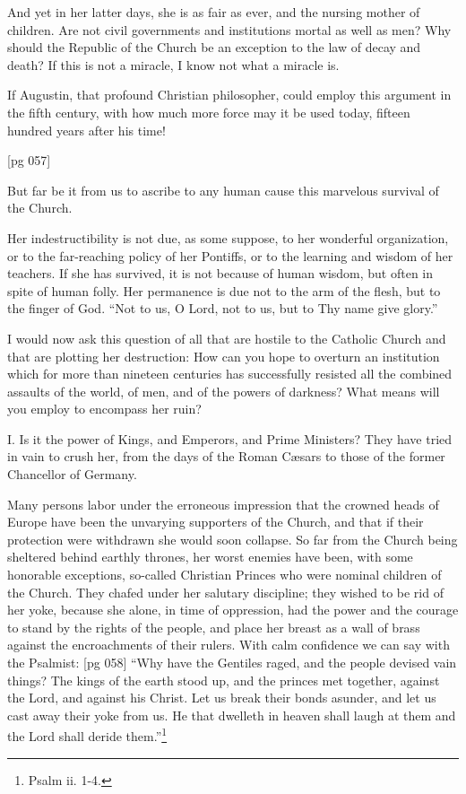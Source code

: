 And yet in her latter days, she is as fair as ever,
and the nursing mother of children. Are not civil
governments and institutions mortal as well as
men? Why should the Republic of the Church be
an exception to the law of decay and death? If
this is not a miracle, I know not what a miracle is.

If Augustin, that profound Christian philosopher,
could employ this argument in the fifth century,
with how much more force may it be used
today, fifteen hundred years after his time!

[pg 057]

But far be it from us to ascribe to any human
cause this marvelous survival of the Church.

Her indestructibility is not due, as some suppose,
to her wonderful organization, or to the far-reaching
policy of her Pontiffs, or to the learning and
wisdom of her teachers. If she has survived, it is
not because of human wisdom, but often in spite of
human folly. Her permanence is due not to the
arm of the flesh, but to the finger of God. “Not to
us, O Lord, not to us, but to Thy name give glory.”

I would now ask this question of all that are
hostile to the Catholic Church and that are plotting
her destruction: How can you hope to overturn
an institution which for more than nineteen
centuries has successfully resisted all the combined
assaults of the world, of men, and of the
powers of darkness? What means will you employ
to encompass her ruin?

I. Is it the power of Kings, and Emperors,
and Prime Ministers? They have tried in vain
to crush her, from the days of the Roman Cæsars
to those of the former Chancellor of Germany.

Many persons labor under the erroneous impression
that the crowned heads of Europe have
been the unvarying supporters of the Church, and
that if their protection were withdrawn she would
soon collapse. So far from the Church being
sheltered behind earthly thrones, her worst enemies
have been, with some honorable exceptions,
so-called Christian Princes who were nominal children
of the Church. They chafed under her salutary
discipline; they wished to be rid of her yoke,
because she alone, in time of oppression, had the
power and the courage to stand by the rights of
the people, and place her breast as a wall of
brass against the encroachments of their rulers.
With calm confidence we can say with the Psalmist:
[pg 058]
“Why have the Gentiles raged, and the people
devised vain things? The kings of the earth
stood up, and the princes met together, against
the Lord, and against his Christ. Let us break
their bonds asunder, and let us cast away their
yoke from us.
He that dwelleth in heaven shall laugh at them
and the Lord shall deride them.”\footnote{Psalm ii. 1-4.}

